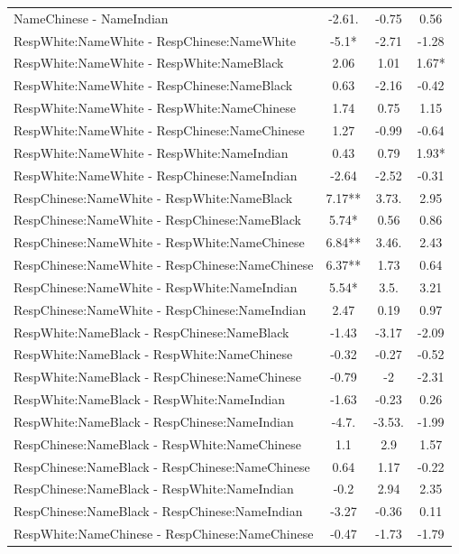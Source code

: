 \documentclass[]{report}
\begin{document}
\begin{table}
{\begin{tabular}[t]{lccc}
		NameChinese - NameIndian & -2.61. & -0.75 & 0.56 \\ 
		RespWhite:NameWhite - RespChinese:NameWhite & -5.1* & -2.71 & -1.28 \\ 
		RespWhite:NameWhite - RespWhite:NameBlack & 2.06 & 1.01 & 1.67* \\ 
		RespWhite:NameWhite - RespChinese:NameBlack & 0.63 & -2.16 & -0.42 \\ 
		RespWhite:NameWhite - RespWhite:NameChinese & 1.74 & 0.75 & 1.15 \\ 
		RespWhite:NameWhite - RespChinese:NameChinese & 1.27 & -0.99 & -0.64 \\ 
		RespWhite:NameWhite - RespWhite:NameIndian & 0.43 & 0.79 & 1.93* \\ 
		RespWhite:NameWhite - RespChinese:NameIndian & -2.64 & -2.52 & -0.31 \\ 
		RespChinese:NameWhite - RespWhite:NameBlack & 7.17** & 3.73. & 2.95 \\ 
		RespChinese:NameWhite - RespChinese:NameBlack & 5.74* & 0.56 & 0.86 \\ 
		RespChinese:NameWhite - RespWhite:NameChinese & 6.84** & 3.46. & 2.43 \\ 
		RespChinese:NameWhite - RespChinese:NameChinese & 6.37** & 1.73 & 0.64 \\ 
		RespChinese:NameWhite - RespWhite:NameIndian & 5.54* & 3.5. & 3.21 \\ 
		RespChinese:NameWhite - RespChinese:NameIndian & 2.47 & 0.19 & 0.97 \\ 
		RespWhite:NameBlack - RespChinese:NameBlack & -1.43 & -3.17 & -2.09 \\ 
		RespWhite:NameBlack - RespWhite:NameChinese & -0.32 & -0.27 & -0.52 \\ 
		RespWhite:NameBlack - RespChinese:NameChinese & -0.79 & -2 & -2.31 \\ 
		RespWhite:NameBlack - RespWhite:NameIndian & -1.63 & -0.23 & 0.26 \\ 
		RespWhite:NameBlack - RespChinese:NameIndian & -4.7. & -3.53. & -1.99 \\ 
		RespChinese:NameBlack - RespWhite:NameChinese & 1.1 & 2.9 & 1.57 \\ 
		RespChinese:NameBlack - RespChinese:NameChinese & 0.64 & 1.17 & -0.22 \\ 
		RespChinese:NameBlack - RespWhite:NameIndian & -0.2 & 2.94 & 2.35 \\ 
		RespChinese:NameBlack - RespChinese:NameIndian & -3.27 & -0.36 & 0.11 \\ 
		RespWhite:NameChinese - RespChinese:NameChinese & -0.47 & -1.73 & -1.79 \\ 

\end{tabular}}
\end{table}
\end{document}
